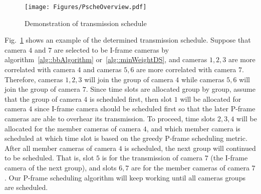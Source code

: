 \begin{figure}
\begin{center}
\texttt{[image: Figures/PscheOverview.pdf]}
\caption{\label{fig::pScheOverview}Demonstration of transmission schedule}
\end{center}
\end{figure}
%
Fig.~\ref{fig::pScheOverview} shows an example of the determined transmission schedule.
Suppose that camera $4$ and $7$ are selected to be I-frame cameras by algorithm~\ref{alg::bbAlgorithm} or~\ref{alg::minWeightDS}, and cameras $1,2,3$ are more correlated with camera $4$ and cameras $5,6$ are more correlated with camera $7$.
Therefore, cameras $1,2,3$ will join the group of camera $4$ while cameras $5,6$ will join the group of camera $7$.
Since time slots are allocated group by group, assume that the group of camera $4$ is scheduled first, then slot $1$ will be allocated for camera $4$ since I-frame camera should be scheduled first so that the later P-frame cameras are able to overhear its transmission.
To proceed, time slots $2,3,4$ will be allocated for the member cameras of camera $4$, and which member camera is scheduled at which time slot is based on the greedy P-frame scheduling metric.
After all member cameras of camera $4$ is scheduled, the next group will continued to be scheduled.
That is, slot $5$ is for the transmission of camera $7$ (the I-frame camera of the next group), and slots $6,7$ are for the member cameras of camera $7$.
Our P-frame scheduling algorithm will keep working until all cameras groups are scheduled.
%
%
%